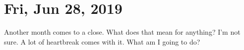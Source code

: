 \section{Fri, Jun 28, 2019}

Another month comes to a close. What does that mean for anything? I'm not sure. 
A lot of heartbreak comes with it. What am I going to do?
